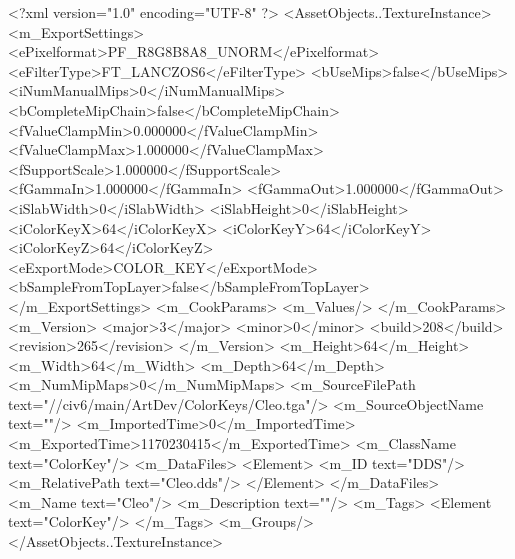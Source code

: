 <?xml version="1.0" encoding="UTF-8" ?>
<AssetObjects..TextureInstance>
	<m_ExportSettings>
		<ePixelformat>PF_R8G8B8A8_UNORM</ePixelformat>
		<eFilterType>FT_LANCZOS6</eFilterType>
		<bUseMips>false</bUseMips>
		<iNumManualMips>0</iNumManualMips>
		<bCompleteMipChain>false</bCompleteMipChain>
		<fValueClampMin>0.000000</fValueClampMin>
		<fValueClampMax>1.000000</fValueClampMax>
		<fSupportScale>1.000000</fSupportScale>
		<fGammaIn>1.000000</fGammaIn>
		<fGammaOut>1.000000</fGammaOut>
		<iSlabWidth>0</iSlabWidth>
		<iSlabHeight>0</iSlabHeight>
		<iColorKeyX>64</iColorKeyX>
		<iColorKeyY>64</iColorKeyY>
		<iColorKeyZ>64</iColorKeyZ>
		<eExportMode>COLOR_KEY</eExportMode>
		<bSampleFromTopLayer>false</bSampleFromTopLayer>
	</m_ExportSettings>
	<m_CookParams>
		<m_Values/>
	</m_CookParams>
	<m_Version>
		<major>3</major>
		<minor>0</minor>
		<build>208</build>
		<revision>265</revision>
	</m_Version>
	<m_Height>64</m_Height>
	<m_Width>64</m_Width>
	<m_Depth>64</m_Depth>
	<m_NumMipMaps>0</m_NumMipMaps>
	<m_SourceFilePath text="//civ6/main/ArtDev/ColorKeys/Cleo.tga"/>
	<m_SourceObjectName text=""/>
	<m_ImportedTime>0</m_ImportedTime>
	<m_ExportedTime>1170230415</m_ExportedTime>
	<m_ClassName text="ColorKey"/>
	<m_DataFiles>
		<Element>
			<m_ID text="DDS"/>
			<m_RelativePath text="Cleo.dds"/>
		</Element>
	</m_DataFiles>
	<m_Name text="Cleo"/>
	<m_Description text=""/>
	<m_Tags>
		<Element text="ColorKey"/>
	</m_Tags>
	<m_Groups/>
</AssetObjects..TextureInstance>


